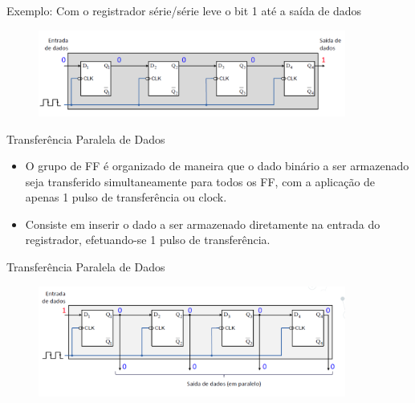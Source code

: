 \documentclass{beamer}
\begin{document}
\begin{frame}{Exemplo: Com o registrador série/série leve o bit 1 até a saída de dados
 }

\begin{figure}
\centering
\includegraphics[width=0.9\textwidth]{figures/seq_5.png}
\end{figure}


\end{frame}


\begin{frame}{Transferência Paralela de Dados }

\begin{itemize}
\item O grupo de FF é organizado de maneira que o dado binário a ser armazenado seja transferido simultaneamente para todos os FF, com a aplicação de apenas 1 pulso de transferência ou clock. 

\item Consiste em inserir o dado a ser armazenado diretamente na entrada do registrador, efetuando-se 1 pulso de transferência.


\end{itemize}




\end{frame}



\begin{frame}{Transferência Paralela de Dados
 }

\begin{figure}
\centering
\includegraphics[width=0.9\textwidth]{figures/par_1.png}
\end{figure}


\end{frame}
\end{document}
